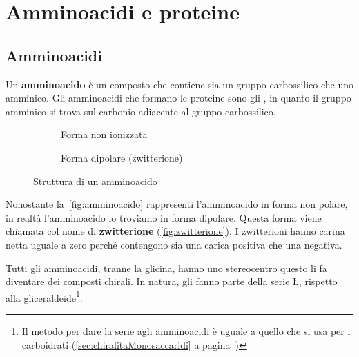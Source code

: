 \chapter{Amminoacidi e proteine}
\section{Amminoacidi}
Un \textbf{amminoacido} è un composto che contiene sia un gruppo carbossilico che uno amminico. Gli amminoacidi che formano le proteine sono gli \textbf{}, in quanto il gruppo amminico si trova sul carbonio adiacente al gruppo carbossilico.

\begin{figure}[H]
	\centering
	\begin{subfigure}{0.4\textwidth}
		\centering
		\caption{Forma non ionizzata}\label{fig:amminoacido}
	\end{subfigure}
	\begin{subfigure}{0.4\textwidth}
		\centering
		\caption{Forma dipolare (zwitterione)}\label{fig:zwitterione}
	\end{subfigure}
	\caption{Struttura di un amminoacido}
\end{figure}

Nonostante la~\autoref{fig:amminoacido} rappresenti l'amminoacido in forma non polare, in realtà l'amminoacido lo troviamo in forma dipolare. Questa forma viene chiamata col nome di \textbf{zwitterione} (\autoref{fig:zwitterione}). I zwitterioni hanno carina netta uguale a zero perché contengono sia una carica positiva che una negativa.

Tutti gli amminoacidi, tranne la glicina, hanno uno stereocentro questo li fa diventare dei composti chirali. In natura, gli  fanno parte della serie \L, rispetto alla gliceraldeide\footnote{Il metodo per dare la serie agli amminoacidi è uguale a quello che si usa per i carboidrati (\autoref{sec:chiralitaMonosaccaridi} a pagina~\pageref{sec:chiralitaMonosaccaridi})}.

